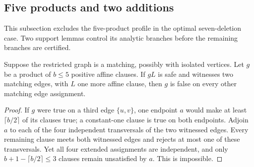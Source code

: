 \subsection{Five products and two additions}
This subsection excludes the five-product profile in the optimal seven-deletion case. Two support lemmas control its analytic branches before the remaining branches are certified.

\begin{lemma}\label{lem:sharedfiveconfinement}
Suppose the restricted graph is a matching, possibly with isolated vertices. Let $g$ be a product of $b\leq5$ positive affine clauses. If $gL$ is safe and witnesses two matching edges, with $L$ one more affine clause, then $g$ is false on every other matching edge assignment.
\end{lemma}
\begin{proof}
If $g$ were true on a third edge $\{u,v\}$, one endpoint $a$ would make at least $\lceil b/2\rceil$ of its clauses true; a constant-one clause is true on both endpoints. Adjoin $a$ to each of the four independent transversals of the two witnessed edges. Every remaining clause meets both witnessed edges and rejects at most one of these transversals. Yet all four extended assignments are independent, and only $b+1-\lceil b/2\rceil\leq3$ clauses remain unsatisfied by $a$. This is impossible.
\end{proof}

